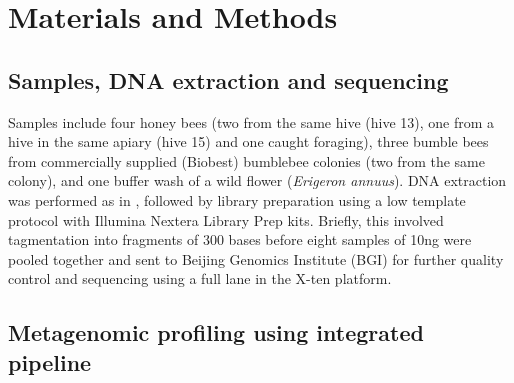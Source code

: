 \documentclass[11pt]{article}
\begin{document}

  \section{Materials and Methods}
    \subsection{Samples, DNA extraction and sequencing}
    Samples include four honey bees (two from the same hive (hive 13), one from a hive in the same apiary (hive 15) and one caught foraging), three bumble bees from commercially supplied (Biobest) bumblebee colonies (two from the same colony), and one buffer wash of a wild flower (\textit{Erigeron annuus}).  
    \newline
    DNA extraction was performed as in \cite{graystock2020dominant}, followed by library preparation using a low template protocol with Illumina Nextera Library Prep kits. Briefly, this involved tagmentation into fragments of 300 bases before eight samples of 10ng were pooled together and sent to Beijing Genomics Institute (BGI) for further quality control and sequencing using a full lane in the X-ten platform. 

    \subsection{Metagenomic profiling using integrated pipeline}
\end{document}
